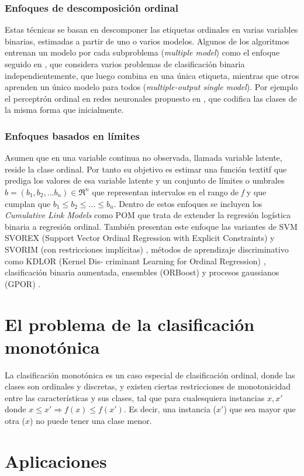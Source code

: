 \subsubsection{Enfoques de descomposición ordinal}
Estas técnicas se basan en descomponer las etiquetas ordinales en varias variables binarias, estimadas a partir de uno o varios modelos. Algunos de los algoritmos entrenan un modelo por cada subproblema (\textit{multiple model}) como el enfoque seguido en \cite{Hall}, que considera varios problemas de clasificación binaria independientemente, que luego combina en una única etiqueta, mientras que otros aprenden un único modelo para todos (\textit{multiple-output single model}). Por ejemplo el perceptrón ordinal en redes neuronales propuesto en \cite{cheng2008neural}, que codifica las clases de la misma forma que \cite{Hall} inicialmente.
\subsubsection{Enfoques basados en límites}
Asumen que en una variable continua no observada, llamada variable latente, reside la clase ordinal. Por tanto su objetivo es estimar una función textit{f} que prediga los valores de esa variable latente y un conjunto de límites o umbrales $b= (b_1,b_2,...b_n) \in \Re^n$ que representan intervalos en el rango de \textit{f} y que cumplan que $b_1 \le b_2 \le ... \le b_n$. Dentro de estos enfoques se incluyen los \textit{Cumulative Link Models} como POM \cite{mccullagh1980regression} que trata de extender la regresión logística binaria a regresión ordinal. También presentan este enfoque las variantes de SVM  SVOREX (Support Vector Ordinal Regression with
Explicit Constraints) y SVORIM (con restricciones implícitas) \cite{chu2007support}, métodos de aprendizaje discriminativo como KDLOR (Kernel Dis-
criminant Learning for Ordinal Regression) \cite{sun2010kernel}, clasificación binaria aumentada, ensembles (ORBoost) \cite{lin2006large} y procesos gaussianos (GPOR) \cite{chu2005gaussian}.
\section{El problema de la clasificación monotónica}
La clasificación monotónica es un caso especial de clasificación ordinal, donde las clases son ordinales y discretas, y existen ciertas restricciones de monotonicidad entre las características y sus clases, tal que para cualesquiera instancias $x, x'$ donde $x \le x' \Rightarrow f(x) \le f(x')$. Es decir, una instancia ($x'$) que sea mayor que otra ($x$) no puede tener una clase menor.
\section{Aplicaciones}